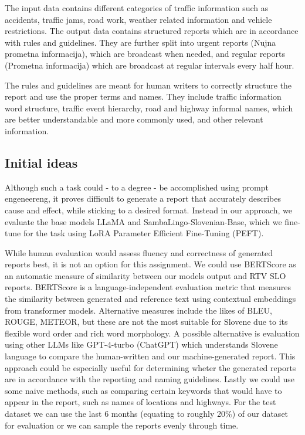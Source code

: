\documentclass[fleqn,moreauthors,10pt]{ds_report}
\begin{document}
The input data contains different categories of traffic information such as accidents, traffic jams, road work, weather related information and vehicle restrictions.
The output data contains structured reports which are in accordance with rules and guidelines. They are further split into urgent reports (Nujna prometna informacija), which are broadcast when needed, and regular reports (Prometna informacija) which are broadcast at regular intervals every half hour.

The rules and guidelines are meant for human writers to correctly structure the report and use the proper terms and names. They include traffic information word structure, traffic event hierarchy, road and highway informal names, which are better understandable and more commonly used, and other relevant information.


\subsection*{Initial ideas}
Although such a task could - to a degree - be accomplished using prompt engeneereng, it proves difficult to generate a report that accurately describes cause and effect, while sticking to a desired format.
Instead in our approach, we evaluate the base models LLaMA and SambaLingo-Slovenian-Base, which we fine-tune for the task using LoRA Parameter Efficient Fine-Tuning (PEFT). 

While human evaluation would assess fluency and correctness of generated reports best, it is not an option for this assignment. We could use BERTScore \cite{bert-score} as an automatic measure of similarity between our models output and RTV SLO reports. BERTScore is a language-independent evaluation metric that measures the similarity between generated and reference text using contextual embeddings from transformer models. Alternative measures include the likes of BLEU, ROUGE, METEOR, but these are not the most suitable for Slovene due to its flexible word order and rich word morphology.
A possible alternative is evaluation using other LLMs like GPT-4-turbo (ChatGPT) which understands Slovene language to compare the human-written and our machine-generated report. This approach could be especially useful for determining wheter the generated reports are in accordance with the reporting and naming guidelines.
Lastly we could use some naive methods, such as comparing certain keywords that would have to appear in the report, such as names of locations and highways.
For the test dataset we can use the last 6 months (equating to roughly 20\%) of our dataset for evaluation or we can sample the reports evenly through time.
\end{document}
